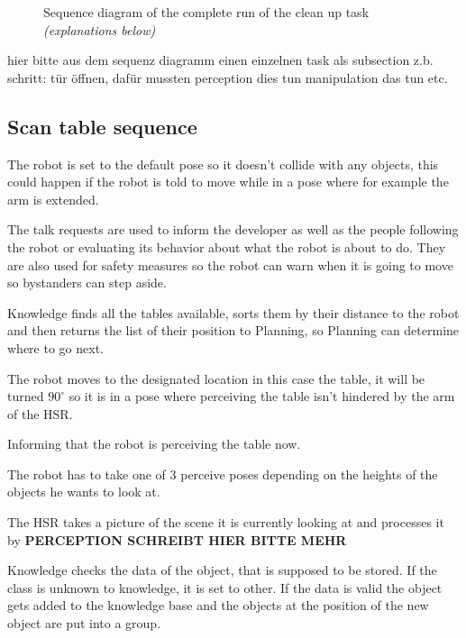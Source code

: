 \documentclass[main.tex]{subfiles}
\begin{document}
\begin{figure}
	  		\caption{Sequence diagram of the complete run of the clean up task \textit{(explanations below)}}
	  		\label{Clean Up sequence}
	  	\end{figure}
		hier bitte aus dem sequenz diagramm einen einzelnen task als subsection z.b. schritt: tür öffnen, dafür mussten perception dies tun manipulation das tun etc.
		

	\subsection{Scan table sequence}
	The robot is set to the default pose so it doesn't collide with any objects, this could happen if the robot is told to move while in a pose where for example the arm is extended.
	
	
	The talk requests are used to inform the developer as well as the people following the robot or evaluating its behavior about what the robot is about to do. They are also used for safety measures so the robot can warn when it is going to move so bystanders can step aside. 
	
	Knowledge finds all the tables available, sorts them by their distance to the robot and then returns the list of their position to Planning, so Planning can determine where to go next.
	
	
	The robot moves to the designated location in this case the table, it will be turned $90^\circ$ so it is in a pose where perceiving the table isn't hindered by the arm of the HSR. 
	
	Informing that the robot is perceiving the table now.
	
	The robot has to take one of 3 perceive poses depending on the heights of the objects he wants to look at.
	
	The HSR takes a picture of the scene it is currently looking at and processes it by \textbf{PERCEPTION SCHREIBT HIER BITTE MEHR}
	
	Knowledge checks the data of the object, that is supposed to be stored. If the class is unknown to knowledge, it is set to other. If the data is valid the object gets added to the knowledge base and the objects at the position of the new object are put into a group.
	
\end{document}
